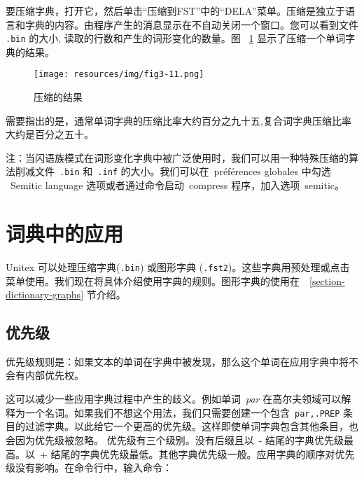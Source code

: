 \noindent 要压缩字典，打开它，然后单击“压缩到FST”中的“DELA”菜单。压缩是独立于语言和字典的内容。由程序产生的消息显示在不自动关闭一个窗口。您可以看到文件
\verb+.bin+ 的大小, 读取的行数和产生的词形变化的数量。图 ~\ref{fig-compression-result} 显示了压缩一个单词字典的结果。

\bigskip
\begin{figure}[!h]
\begin{center}
\texttt{[image: resources/img/fig3-11.png]}
\caption{压缩的结果\label{fig-compression-result}}
\end{center}
\end{figure}

\bigskip
\noindent 需要指出的是，通常单词字典的压缩比率大约百分之九十五,复合词字典压缩比率大约是百分之五十。

\bigskip
\noindent 注：当闪语族模式在词形变化字典中被广泛使用时，我们可以用一种特殊压缩的算法削减文件\ \verb+.bin+ 和\ \verb+.inf+ 的大小。我们可以在\ préférences globales 中勾选 \ Semitic language 选项或者通过命令启动\ compress 程序，加入选项\ semitic。


\section{词典中的应用}
\label{section-applying-dictionaries}

\bigskip
\noindent 
Unitex 可以处理压缩字典(\verb+.bin+) 或图形字典 (\verb+.fst2+)。这些字典用预处理或点击菜单使用。我们现在将具体介绍使用字典的规则。图形字典的使用在\ ~\ref{section-dictionary-graphs} 节介绍。


\subsection{优先级}
\label{section-dictionary-priorities}
优先级规则是：如果文本的单词在字典中被发现，那么这个单词在应用字典中将不会有内部优先权。


\bigskip
\noindent 
这可以减少一些应用字典过程中产生的歧义。例如单词\ \textit{par} 在高尔夫领域可以解释为一个名词。如果我们不想这个用法，我们只需要创建一个包含\ \verb$par,.PREP$ 条目的过滤字典。以此给它一个更高的优先级。这样即使单词字典包含其他条目，也会因为优先级被忽略。
优先级有三个级别。没有后缀且以\ - 结尾的字典优先级最高。以\ + 结尾的字典优先级最低。其他字典优先级一般。应用字典的顺序对优先级没有影响。在命令行中，输入命令：




